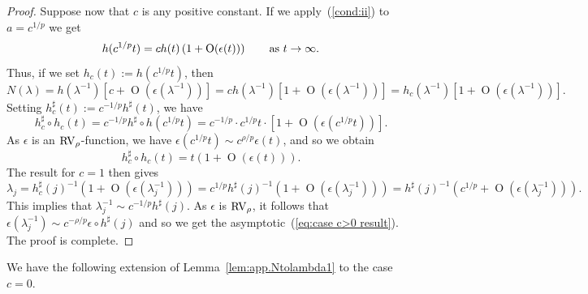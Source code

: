 \documentclass[10pt, a4paper]{amsart}
\newcommand{\op}{\operatorname}
\numberwithin{equation}{section}
\theoremstyle{definition}
\theoremstyle{remark}
\newcommand{\RV}{\textup{RV}}
\begin{document}
\begin{proof}
Suppose now that $c$ is any positive constant. If we apply~(\ref{cond:ii}) to $a=c^{1/p}$ we get
\begin{equation*}
h(c^{1/p}t)=c h(t)\left(1+\op{O}(\epsilon(t))\right) \qquad \textup{as}\ t\rightarrow \infty.
\end{equation*}
Thus, if we set $h_c(t):=h(c^{1/p}t)$, then 
\begin{equation*}
N(\lambda)=h(\lambda^{-1}) \left[ c+\op{O}\left(\epsilon(\lambda^{-1})\right)\right]=ch(\lambda^{-1}) \left[ 1+\op{O}\left(\epsilon(\lambda^{-1})\right)\right]=h_c(\lambda^{-1}) \left[ 1+\op{O}\left(\epsilon(\lambda^{-1})\right)\right].
\end{equation*}
Setting $h_c^\sharp(t):=c^{-1/p}h^\sharp(t)$, we have
\begin{equation*}
h_c^\sharp\circ h_c(t)=c^{-1/p}h^\sharp \circ h(c^{1/p}t)=c^{-1/p}\cdot c^{1/p}t\cdot[1+\op{O}(\epsilon(c^{1/p}t))].
\end{equation*}
As $\epsilon$ is an $\RV_\rho$-function, we have $ \epsilon(c^{1/p}t)\sim c^{\rho/p}\epsilon(t)$, and so we obtain
\begin{equation*}
h_c^\sharp\circ h_c(t)=t(1+\op{O}(\epsilon(t))).
\end{equation*}
The result for $c=1$ then gives
\begin{equation*}
\lambda_j= h_c^\sharp(j)^{-1}(1+\op{O}(\epsilon(\lambda_j^{-1})))= c^{1/p}h^\sharp(j)^{-1}(1+\op{O}(\epsilon(\lambda_j^{-1})))=h^\sharp(j)^{-1}(c^{1/p}+\op{O}(\epsilon(\lambda_j^{-1}))).
\end{equation*}
This implies that $\lambda_j^{-1}\sim c^{-1/p}h^\sharp(j)$. As $\epsilon$ is $\RV_\rho$, it follows that $\epsilon(\lambda_j^{-1})\sim c^{-\rho/p}\epsilon \circ h^\sharp(j)$ and so we get the asymptotic~(\ref{eq:case c>0 result}). The proof is complete. 
\end{proof}

We have the following extension of Lemma~\ref{lem:app.Ntolambda1} to the case $c=0$. 
\end{document}
